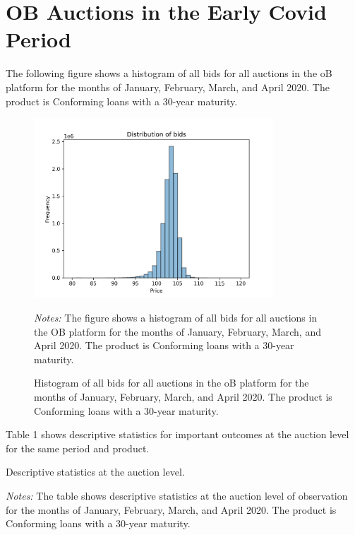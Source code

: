 \documentclass[11pt,a4paper]{article}
\begin{document}
\pagebreak
\section{OB Auctions in the Early Covid Period}

The following figure shows a histogram of all bids for all auctions in the oB platform for the months of January, February, March, and April 2020. The product is Conforming loans with a 30-year maturity. 


\begin{figure}[h]
    \centering
    \includegraphics[width=0.8\textwidth]{../results/figures/distribution_of_bids.png}
    \caption{Histogram of all bids for all auctions in the oB platform for the months of January, February, March, and April 2020. The product is Conforming loans with a 30-year maturity.}
    \begin{minipage}{\textwidth}
        \footnotesize{\textit{Notes:} The figure shows a histogram of all bids for all auctions in the OB platform for the months of January, February, March, and April 2020. The product is Conforming loans with a 30-year maturity. } 
        \end{minipage}
\end{figure}


Table 1 shows descriptive statistics for important outcomes at the auction level for the same period and product. 


\begin{table}
    \centering
    
    \caption{Descriptive statistics at the auction level. }
    \begin{minipage}{\textwidth}
        \footnotesize{\textit{Notes:} The table shows descriptive statistics at the auction level of observation for the months of January, February, March, and April 2020. The product is Conforming loans with a 30-year maturity. } 
        \end{minipage}
\end{table}
\end{document}
